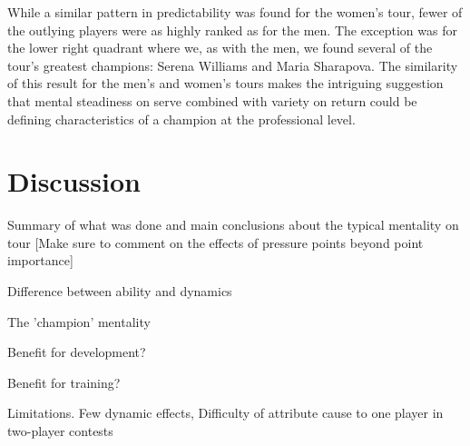 \documentclass{Latex/svjour3}
\begin{document}
While a similar pattern in predictability was found for the women's
tour, fewer of the outlying players were as highly ranked as for the
men. The exception was for the lower right quadrant where we, as with
the men, we found several of the tour's greatest champions: Serena
Williams and Maria Sharapova. The similarity of this result for the
men's and women's tours makes the intriguing suggestion that mental
steadiness on serve combined with variety on return could be defining
characteristics of a champion at the professional level. 


\section{Discussion}

Summary of what was done and main conclusions about the typical
mentality on tour [Make sure to comment on the effects of pressure
points beyond point importance]

Difference between ability and dynamics

The  'champion'  mentality

Benefit for development?

Benefit for training?

Limitations. Few dynamic effects, Difficulty of attribute cause to
one player in two-player contests


 


\clearpage
\end{document}

